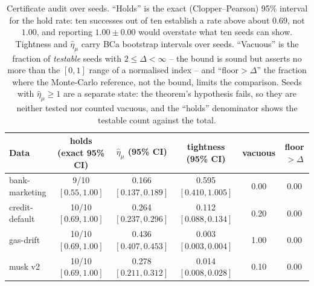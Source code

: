 \begin{table}[t]
\caption{Certificate audit over seeds. ``Holds'' is the exact (Clopper--Pearson) 95\% interval for the hold rate: ten successes out of ten establish a rate above about $0.69$, not $1.00$, and reporting $1.00\pm0.00$ would overstate what ten seeds can show. Tightness and $\hat\eta_\mu$ carry BCa bootstrap intervals over seeds. ``Vacuous'' is the fraction of \emph{testable} seeds with $2\le\Delta<\infty$ -- the bound is sound but asserts no more than the $[0,1]$ range of a normalised index -- and ``floor$>\Delta$'' the fraction where the Monte-Carlo reference, not the bound, limits the comparison. Seeds with $\hat\eta_\mu\ge1$ are a separate state: the theorem's hypothesis fails, so they are neither tested nor counted vacuous, and the ``holds'' denominator shows the testable count against the total.}
\label{tab:certci}
\begin{center}\footnotesize
\begin{tabular}{@{}lccccc@{}}
\toprule
\textbf{Data} & \textbf{holds (exact 95\% CI)} & $\hat\eta_\mu$ \textbf{(95\% CI)} & \textbf{tightness (95\% CI)} & \textbf{vacuous} & \textbf{floor}$>\Delta$ \\
\midrule
bank-marketing & 9/10 $[0.55,1.00]$ & 0.166 $[0.137,0.189]$ & 0.595 $[0.410,1.005]$ & 0.00 & 0.00 \\
credit-default & 10/10 $[0.69,1.00]$ & 0.264 $[0.237,0.296]$ & 0.112 $[0.088,0.134]$ & 0.20 & 0.00 \\
gas-drift & 10/10 $[0.69,1.00]$ & 0.436 $[0.407,0.453]$ & 0.003 $[0.003,0.004]$ & 1.00 & 0.00 \\
musk v2 & 10/10 $[0.69,1.00]$ & 0.278 $[0.211,0.312]$ & 0.014 $[0.008,0.028]$ & 0.10 & 0.00 \\
\bottomrule
\end{tabular}
\end{center}
\end{table}
